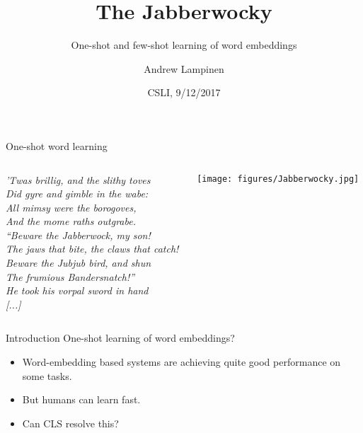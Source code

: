 \documentclass{beamer}
\begin{document}
\title{The Jabberwocky}
\subtitle{One-shot and few-shot learning of word embeddings}
\author{Andrew Lampinen}
\date{CSLI, 9/12/2017}
\frame{\titlepage}

\begin{frame}{One-shot word learning}
\begin{columns}
\begin{column}{0.5\textwidth}
\textit{’Twas brillig, and the slithy toves}\\
\textit{Did gyre and gimble in the wabe:}\\ 
\textit{All mimsy were the borogoves,}\\
\textit{And the mome raths outgrabe.}\\[10pt]

\textit{“Beware the Jabberwock, my son! }\\
\textit{The jaws that bite, the claws that catch!}\\
\textit{Beware the Jubjub bird, and shun}\\ 
\textit{The frumious Bandersnatch!” }\\[10pt]

\textit{He took his vorpal sword in hand}\\
\textit{[...]}
\end{column}
\begin{column}{0.5\textwidth}
\centering
\texttt{[image: figures/Jabberwocky.jpg]}
\end{column}
\end{columns}
\end{frame}

\begin{frame}{Introduction}
One-shot learning of word embeddings? 
\begin{itemize}
    \item<2-> Word-embedding based systems are achieving quite good performance on some tasks. 
    \item<3-> But humans can learn fast.
    \item<4-> Can CLS resolve this?
\end{itemize}
\end{frame}
\end{document}
